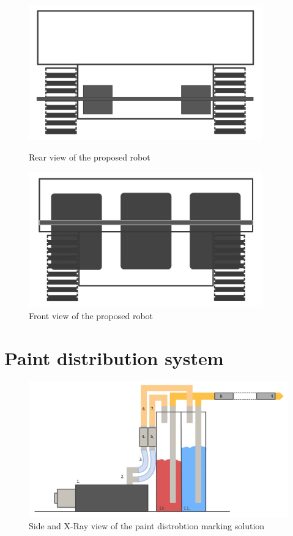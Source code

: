 \begin{figure}[!ht]
    \centering
    \begin{minipage}{0.5\textwidth}
        \centering
\includegraphics[width=0.9\textwidth]{00 - Images/rear_view_sp.png}
\caption{Rear view of the proposed robot}
    \end{minipage}\hfill
    \begin{minipage}{0.5\textwidth}
        \centering
\includegraphics[width=0.9\textwidth]{00 - Images/front_view_sp.jpeg}
\caption{Front view of the proposed robot}
    \end{minipage}
\end{figure}

\newpage

\section*{Paint distribution system}

\begin{figure}[!ht]
  \centering
  \includegraphics[width=\textwidth]{00 - Images/paint_disto_sp.jpeg}
  \caption{Side and X-Ray view of the paint distrobtion marking solution}
  \label{fig:paint_distro}
\end{figure}

